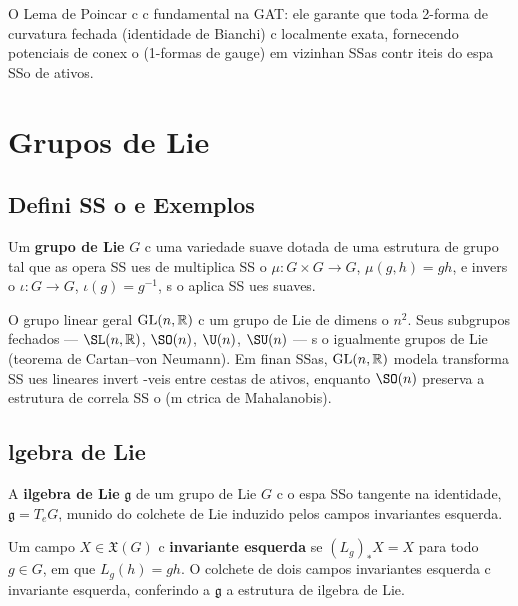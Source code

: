 O Lema de Poincar c c fundamental na GAT: ele garante que toda 2-forma de curvatura fechada (identidade de Bianchi) c localmente exata, fornecendo potenciais de conex o (1-formas de gauge) em vizinhan SSas contr iteis do espa SSo de ativos.

\section{Grupos de Lie}
\label{sec:grupos_lie}

\subsection{Defini SS o e Exemplos}

\begin{defi}
Um \textbf{grupo de Lie} $G$ c uma variedade suave dotada de uma estrutura de grupo tal que as opera SS ues de multiplica SS o $\mu:G\times G\to G$, $\mu(g,h)=gh$, e invers o $\iota:G\to G$, $\iota(g)=g^{-1}$, s o aplica SS ues suaves.
\end{defi}

\begin{ex}
O grupo linear geral $\mathrm{GL}(n,\mathbb{R})$ c um grupo de Lie de dimens o $n^2$. Seus subgrupos fechados --- $\SL(n,\R)$, $\SO(n)$, $\U(n)$, $\SU(n)$ --- s o igualmente grupos de Lie (teorema de Cartan--von Neumann). Em finan SSas, $\mathrm{GL}(n,\mathbb{R})$ modela transforma SS ues lineares invert -veis entre cestas de ativos, enquanto $\SO(n)$ preserva a estrutura de correla SS o (m ctrica de Mahalanobis).
\end{ex}

\subsection{ lgebra de Lie}

\begin{defi}
A \textbf{ ilgebra de Lie} $\mathfrak{g}$ de um grupo de Lie $G$ c o espa SSo tangente na identidade, $\mathfrak{g}=T_eG$, munido do colchete de Lie induzido pelos campos invariantes esquerda.
\end{defi}

Um campo $X\in\mathfrak{X}(G)$ c \textbf{invariante esquerda} se $(L_g)_*X = X$ para todo $g\in G$, em que $L_g(h)=gh$. O colchete de dois campos invariantes esquerda c invariante esquerda, conferindo a $\mathfrak{g}$ a estrutura de ilgebra de Lie.

